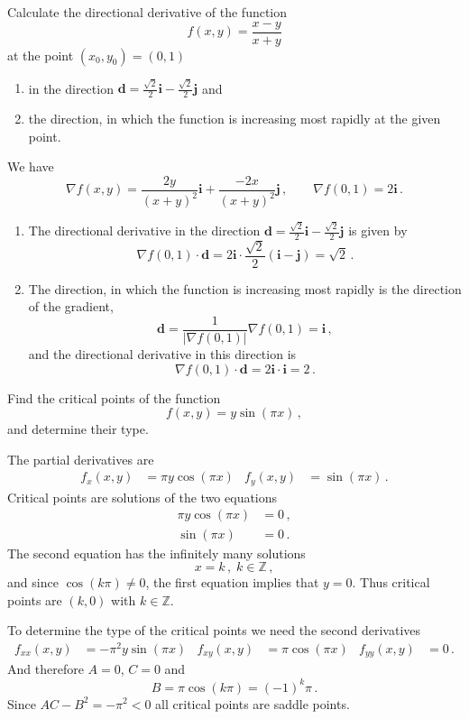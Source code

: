 \begin{question}
Calculate the directional derivative of the function
\[
f(x, y) = \frac{x-y}{x+y}
\]
at the point $(x_0, y_0) = (0,1)$
\begin{enumerate}
\item
in the direction $\displaystyle \mathbf d = \frac{\sqrt 2}{2} \mathbf i - \frac{\sqrt{2}}{2} \mathbf j$ and
\item
the direction, in which the function is increasing most rapidly at the given point.
\end{enumerate}
\end{question}

\begin{solution}
We have
\[
\nabla f(x,y) = \frac{2y}{(x+y)^2} \mathbf i + \frac{-2x}{(x+y)^2} \mathbf j\,,
\qquad
\nabla f(0,1) = 2 \mathbf i\,.
\]
\begin{enumerate}
\item
The directional derivative in the direction $\displaystyle \mathbf d = \frac{\sqrt 2}{2} \mathbf i - \frac{\sqrt{2}}{2} \mathbf j$ is given by
\[
\nabla f(0,1) \cdot \mathbf d = 2 \mathbf i \cdot \frac{\sqrt 2}{2} \left( \mathbf i - \mathbf j \right) = \sqrt 2\,.
\]
\item
The direction, in which the function is increasing most rapidly is the direction of the gradient,
\[
\mathbf d = \frac{1}{|\nabla f(0,1)|} \nabla f(0,1) = \mathbf i\,,
\]
and the directional derivative in this direction is
\[
\nabla f(0,1) \cdot \mathbf d = 2\mathbf i \cdot \mathbf i = 2\,.
\]
\end{enumerate}
\end{solution}

\begin{question}
Find the critical points of the function
\[
f(x,y) = y \sin(\pi x)\,,
\]
and determine their type.
\end{question}

\begin{solution}
The partial derivatives are
\begin{align*}
f_x(x,y) &= \pi y \cos(\pi x) &
f_y(x,y) &= \sin(\pi x)\,.
\end{align*}
Critical points are solutions of the two equations
\begin{align*}
\pi y \cos(\pi x) &= 0\,, \\
\sin(\pi x) &= 0\,.
\end{align*}
The second equation has the infinitely many solutions
\[
x = k \,,\; k \in \mathbb Z\,,
\]
and since $\cos(k\pi) \neq 0$, the first equation implies that $y=0$. Thus critical points are $(k, 0)$ with $k \in \mathbb Z$.

To determine the type of the critical points we need the second derivatives
\begin{align*}
f_{xx}(x,y) &= -\pi^2 y \sin(\pi x) &
f_{xy}(x,y) &= \pi \cos(\pi x) &
f_{yy}(x,y) &= 0\,.
\end{align*}
And therefore $A=0$, $C=0$ and
\[
B = \pi \cos (k \pi) = (-1)^k \pi\,.
\]
Since $AC - B^2 = -\pi^2 < 0$ all critical points are saddle points.
\end{solution}

